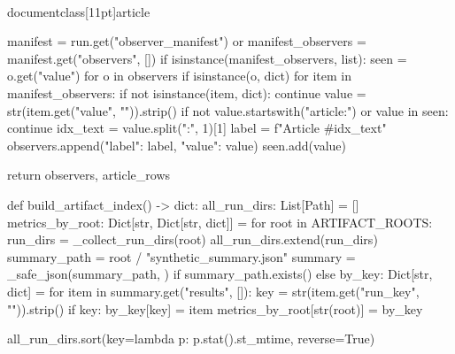 \\documentclass[11pt]{article}
\begin{document}
\begin{CodeBlock}
{    manifest = run.get("observer_manifest") or {}
    manifest_observers = manifest.get("observers", [])
    if isinstance(manifest_observers, list):
        seen = {o.get("value") for o in observers if isinstance(o, dict)}
        for item in manifest_observers:
            if not isinstance(item, dict):
                continue
            value = str(item.get("value", "")).strip()
            if not value.startswith("article:") or value in seen:
                continue
            idx_text = value.split(":", 1)[1]
            label = f"Article #{idx_text}"
            observers.append({"label": label, "value": value})
            seen.add(value)

    return observers, article_rows


def build_artifact_index() -> dict:
    all_run_dirs: List[Path] = []
    metrics_by_root: Dict[str, Dict[str, dict]] = {}
    for root in ARTIFACT_ROOTS:
        run_dirs = _collect_run_dirs(root)
        all_run_dirs.extend(run_dirs)
        summary_path = root / "synthetic_summary.json"
        summary = _safe_json(summary_path, {}) if summary_path.exists() else {}
        by_key: Dict[str, dict] = {}
        for item in summary.get("results", []):
            key = str(item.get("run_key", "")).strip()
            if key:
                by_key[key] = item
        metrics_by_root[str(root)] = by_key

    all_run_dirs.sort(key=lambda p: p.stat().st_mtime, reverse=True)

}
\end{CodeBlock}
\end{document}
